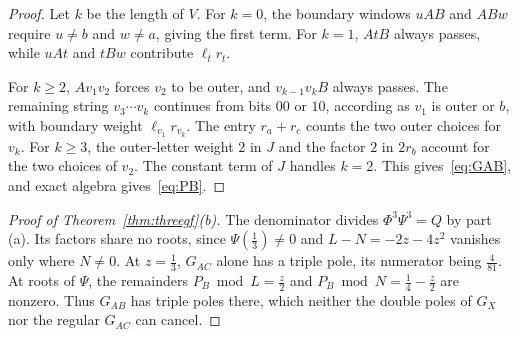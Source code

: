 \documentclass[12pt]{article}
\theoremstyle{plain}
\theoremstyle{definition}
\theoremstyle{remark}
\begin{document}
\begin{proof}
Let $k$ be the length of $V$. For $k=0$, the boundary windows
$uAB$ and $ABw$ require $u\ne b$ and $w\ne a$, giving the first term.
For $k=1$, $AtB$ always passes, while $uAt$ and $tBw$ contribute
$\ell_tr_t$.

For $k\ge2$, $Av_1v_2$ forces $v_2$ to be outer, and
$v_{k-1}v_kB$ always passes. The remaining string $v_3\cdots v_k$
continues from bits $00$ or $10$, according as $v_1$ is outer or $b$,
with boundary weight $\ell_{v_1}r_{v_k}$. The entry $r_a+r_c$
counts the two outer choices for $v_k$. For $k\ge3$, the outer-letter
weight $2$ in $J$ and the factor $2$ in $2r_b$ account for the two choices of $v_2$. The constant term of $J$ handles
$k=2$. This gives~\eqref{eq:GAB}, and exact algebra gives~\eqref{eq:PB}.
\end{proof}

\begin{proof}[Proof of Theorem~\ref{thm:threegf}(b)]
The denominator divides $\Phi^3\Psi^3=Q$ by part (a).
Its factors share no roots, since $\Psi(\frac13)\ne0$ and
$L-N=-2z-4z^2$ vanishes only where $N\ne0$.
At $z=\frac13$, $G_{AC}$ alone has a triple pole, its numerator
being $\frac4{81}$. At roots of $\Psi$, the remainders
$P_B\bmod L=\frac z2$ and $P_B\bmod N=\frac14-\frac z2$
are nonzero. Thus $G_{AB}$ has triple poles there, which neither
the double poles of $G_X$ nor the regular $G_{AC}$ can cancel.
\end{proof}
\end{document}
